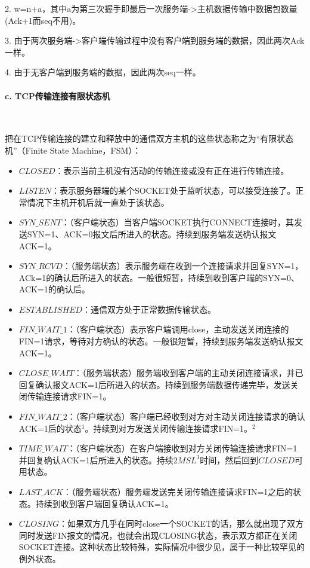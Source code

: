 \documentclass[UTF8]{article}%
\begin{document}
2. w=n+a，其中a为第三次握手即最后一次服务端->主机数据传输中数据包数量(Ack+1而seq不用)。

3. 由于两次服务端->客户端传输过程中没有客户端到服务端的数据，因此两次Ack一样。

4. 由于无客户端到服务端的数据，因此两次seq一样。



\paragraph{c. TCP传输连接有限状态机}~{}

把在TCP传输连接的建立和释放中的通信双方主机的这些状态称之为“有限状态机”（Finite State Machine，FSM）：

\begin{itemize}
    \item $CLOSED$：表示当前主机没有活动的传输连接或没有正在进行传输连接。
    \item $LISTEN$：表示服务器端的某个SOCKET处于监听状态，可以接受连接了。正常情况下主机开机后就一直处于该状态。
    \item $SYN\_SENT$：（客户端状态）当客户端SOCKET执行CONNECT连接时，其发送SYN=1、ACK=0报文后所进入的状态。持续到服务端发送确认报文ACK=1。
    \item $SYN\_RCVD$：（服务端状态）表示服务端在收到一个连接请求并回复SYN=1，ACk=1的确认后所进入的状态。一般很短暂，持续到收到客户端的SYN=0、ACK=1的确认后。
    \item $ESTABLISHED$：通信双方处于正常数据传输状态。
    \item $FIN\_WAIT\_1$：（客户端状态）表示客户端调用close，主动发送关闭连接的FIN=1请求，等待对方确认的状态。一般很短暂，持续到服务端发送确认报文ACK=1。
    \item $CLOSE\_WAIT$：（服务端状态）服务端收到客户端的主动关闭连接请求，并已回复确认报文ACK=1后所进入的状态。持续到服务端数据传递完毕，发送关闭传输连接请求FIN=1。
    \item $FIN\_WAIT\_2$：（客户端状态）客户端已经收到对方对主动关闭连接请求的确认ACK=1后的状态$^1$。持续到对方发送关闭传输连接请求FIN=1。$^2$
    \item $TIME\_WAIT$：（客户端状态）在客户端接收到对方关闭传输连接请求FIN=1并回复确认ACK=1后所进入的状态。持续$2MSL^3$时间，然后回到$CLOSED$可用状态。
    \item $LAST\_ACK$：（服务端状态）服务端发送完关闭传输连接请求FIN=1之后的状态。持续到收到客户端回复确认ACK=1。
    \item $CLOSING$：如果双方几乎在同时close一个SOCKET的话，那么就出现了双方同时发送FIN报文的情况，也就会出现CLOSING状态，表示双方都正在关闭SOCKET连接。这种状态比较特殊，实际情况中很少见，属于一种比较罕见的例外状态。
\end{itemize}
\end{document}
